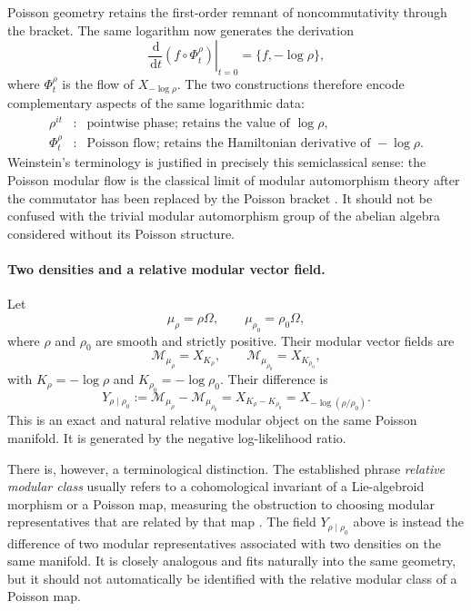 \documentclass[a4paper,11pt]{article}
\theoremstyle{definition}
\newcommand{\dd}{\,\mathrm{d}}
\begin{document}
Poisson geometry retains the first-order remnant of noncommutativity through the bracket.  The same logarithm now generates the derivation
\[
\left.\frac{\dd}{\dd t}(f\circ\Phi_t^\rho)\right|_{t=0}
=
\{f,-\log\rho\},
\]
where $\Phi_t^\rho$ is the flow of $X_{-\log\rho}$.  The two constructions therefore encode complementary aspects of the same logarithmic data:
\[
\begin{array}{ccl}
\rho^{it} &:& \text{pointwise phase; retains the value of }\log\rho,\\[1mm]
\Phi_t^\rho &:& \text{Poisson flow; retains the Hamiltonian derivative of }-\log\rho.
\end{array}
\]
Weinstein's terminology is justified in precisely this semiclassical sense: the Poisson modular flow is the classical limit of modular automorphism theory after the commutator has been replaced by the Poisson bracket \cite{Weinstein1997}.  It should not be confused with the trivial modular automorphism group of the abelian algebra considered without its Poisson structure.

\paragraph{Two densities and a relative modular vector field.}
Let
\[
\mu_\rho=\rho\Omega,
\qquad
\mu_{\rho_0}=\rho_0\Omega,
\]
where $\rho$ and $\rho_0$ are smooth and strictly positive.  Their modular vector fields are
\[
\mathcal{M}_{\mu_\rho}=X_{K_\rho},
\qquad
\mathcal{M}_{\mu_{\rho_0}}=X_{K_{\rho_0}},
\]
with $K_\rho=-\log\rho$ and $K_{\rho_0}=-\log\rho_0$.  Their difference is
\[
\boxed{
Y_{\rho\mid\rho_0}
:=
\mathcal{M}_{\mu_\rho}-\mathcal{M}_{\mu_{\rho_0}}
=
X_{K_\rho-K_{\rho_0}}
=
X_{-\log(\rho/\rho_0)}.
}
\]
This is an exact and natural relative modular object on the same Poisson manifold.  It is generated by the negative log-likelihood ratio.

There is, however, a terminological distinction.  The established phrase \emph{relative modular class} usually refers to a cohomological invariant of a Lie-algebroid morphism or a Poisson map, measuring the obstruction to choosing modular representatives that are related by that map \cite{KosmannWeinstein2005,CaseiroFernandes2013}.  The field $Y_{\rho\mid\rho_0}$ above is instead the difference of two modular representatives associated with two densities on the same manifold.  It is closely analogous and fits naturally into the same geometry, but it should not automatically be identified with the relative modular class of a Poisson map.
\end{document}
